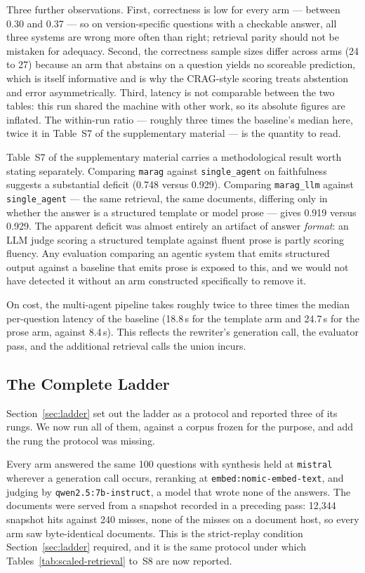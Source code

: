 \documentclass[acmsmall,review,anonymous,screen]{acmart}
\begin{document}
Three further observations. First, correctness is low for every arm --- between
0.30 and 0.37 --- so on version-specific questions with a checkable answer, all
three systems are wrong more often than right; retrieval parity should not be
mistaken for adequacy. Second, the correctness sample sizes differ across arms
(24 to 27) because an arm that abstains on a question yields no scoreable
prediction, which is itself informative and is why the CRAG-style scoring treats
abstention and error asymmetrically. Third, latency is not comparable between
the two tables: this run shared the machine with other work, so its absolute
figures are inflated. The within-run ratio --- roughly three times the
baseline's median here, twice it in Table~S7 of the supplementary material --- is the
quantity to read.

Table~S7 of the supplementary material carries a methodological result worth stating
separately. Comparing \texttt{marag} against \texttt{single\_agent} on
faithfulness suggests a substantial deficit (0.748 versus 0.929). Comparing
\texttt{marag\_llm} against \texttt{single\_agent} --- the same retrieval, the
same documents, differing only in whether the answer is a structured template or
model prose --- gives 0.919 versus 0.929. The apparent deficit was almost
entirely an artifact of answer \emph{format}: an LLM judge scoring a structured
template against fluent prose is partly scoring fluency. Any evaluation
comparing an agentic system that emits structured output against a baseline that
emits prose is exposed to this, and we would not have detected it without an arm
constructed specifically to remove it.

On cost, the multi-agent pipeline takes roughly twice to three times the median
per-question latency of the baseline (18.8\,s for the template arm and
24.7\,s for the prose arm, against 8.4\,s). This reflects the
rewriter's generation call, the evaluator pass, and the additional retrieval
calls the union incurs.

\subsection{The Complete Ladder}\label{sec:ladder-results}

Section~\ref{sec:ladder} set out the ladder as a protocol and reported three of
its rungs. We now run all of them, against a corpus frozen for the purpose, and
add the rung the protocol was missing.

Every arm answered the same 100 questions with synthesis held at
\texttt{mistral} wherever a generation call occurs, reranking at
\texttt{embed:nomic-embed-text}, and judging by
\texttt{qwen2.5:7b-instruct}, a model that wrote none of the answers. The
documents were served from a snapshot recorded in a preceding pass: 12,344
snapshot hits against 240 misses, none of the misses on a document host, so
every arm saw byte-identical documents. This is the strict-replay condition
Section~\ref{sec:ladder} required, and it is the same protocol under which
Tables~\ref{tab:scaled-retrieval} to~S8 are now reported.
\end{document}
